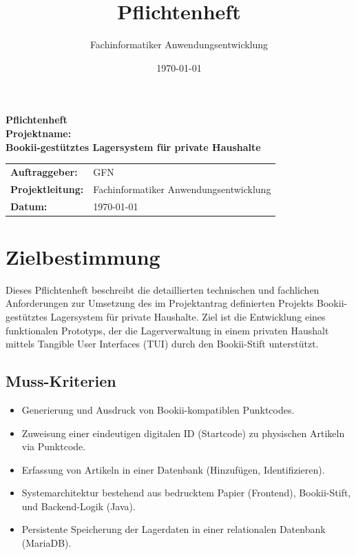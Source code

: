\documentclass[12pt, a4paper]{article}
\title{Pflichtenheft}
\author{Fachinformatiker Anwendungsentwicklung}
\date{\today}
\begin{document}
\begin{titlepage}
    \centering
    \vspace*{2cm}
    {\Huge \textbf{Pflichtenheft}}\\[1.5cm]
    {\Large \textbf{Projektname:}\\[0.3cm]
    \textbf{\glqq Bookii-gestütztes Lagersystem für private Haushalte\grqq}}\\[2cm]

    \begin{tabular}{>{\bfseries}l l}
        Auftraggeber: & GFN \\
        Projektleitung: & Fachinformatiker Anwendungsentwicklung \\
        Datum: & \today \\
    \end{tabular}
    \vfill
\end{titlepage}

\setcounter{page}{1}
\tableofcontents
\newpage

\section{Zielbestimmung}
Dieses Pflichtenheft beschreibt die detaillierten technischen und fachlichen Anforderungen zur Umsetzung des im Projektantrag definierten Projekts \glqq Bookii-gestütztes Lagersystem für private Haushalte\grqq. Ziel ist die Entwicklung eines funktionalen Prototyps, der die Lagerverwaltung in einem privaten Haushalt mittels Tangible User Interfaces (TUI) durch den Bookii-Stift unterstützt.

\subsection{Muss-Kriterien}
\begin{itemize}
    \item Generierung und Ausdruck von Bookii-kompatiblen Punktcodes.
    \item Zuweisung einer eindeutigen digitalen ID (Startcode) zu physischen Artikeln via Punktcode.
    \item Erfassung von Artikeln in einer Datenbank (Hinzufügen, Identifizieren).
    \item Systemarchitektur bestehend aus bedrucktem Papier (Frontend), Bookii-Stift, und Backend-Logik (Java).
    \item Persistente Speicherung der Lagerdaten in einer relationalen Datenbank (MariaDB).
\end{itemize}
\end{document}
